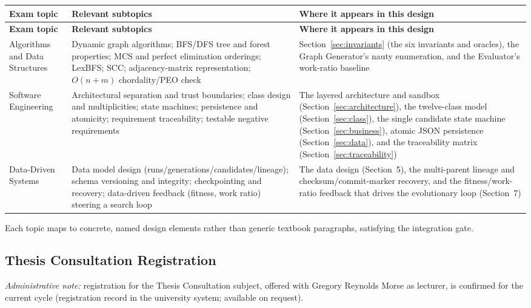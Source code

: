 \documentclass[12pt,a4paper]{article}
\begin{document}
\begin{longtable}{|p{4cm}|p{6cm}|p{4.5cm}|}
\hline
\textbf{Exam topic} & \textbf{Relevant subtopics} & \textbf{Where it appears in this design} \\
\hline
\endfirsthead
\hline
\textbf{Exam topic} & \textbf{Relevant subtopics} & \textbf{Where it appears in this design} \\
\hline
\endhead
\hline
\endfoot

Algorithms and Data Structures & Dynamic graph algorithms; BFS/DFS tree and forest properties; MCS and perfect elimination orderings; LexBFS; SCC; adjacency-matrix representation; $O(n+m)$ chordality/PEO check & Section~\ref{sec:invariants} (the six invariants and oracles), the Graph Generator's nauty enumeration, and the Evaluator's work-ratio baseline \\
\hline
Software Engineering & Architectural separation and trust boundaries; class design and multiplicities; state machines; persistence and atomicity; requirement traceability; testable negative requirements & The layered architecture and sandbox (Section~\ref{sec:architecture}), the twelve-class model (Section~\ref{sec:class}), the single candidate state machine (Section~\ref{sec:business}), atomic JSON persistence (Section~\ref{sec:data}), and the traceability matrix (Section~\ref{sec:traceability}) \\
\hline
Data-Driven Systems & Data model design (runs/generations/candidates/lineage); schema versioning and integrity; checkpointing and recovery; data-driven feedback (fitness, work ratio) steering a search loop & The data design (Section~5), the multi-parent lineage and checksum/commit-marker recovery, and the fitness/work-ratio feedback that drives the evolutionary loop (Section~7) \\
\hline
\end{longtable}

Each topic maps to concrete, named design elements rather than generic textbook paragraphs, satisfying the integration gate.

\subsection{Thesis Consultation Registration}

\emph{Administrative note:} registration for the Thesis Consultation subject, offered with Gregory Reynolds Morse as lecturer, is confirmed for the current cycle (registration record in the university system; available on request).

\clearpage
{}
{}


\end{document}

